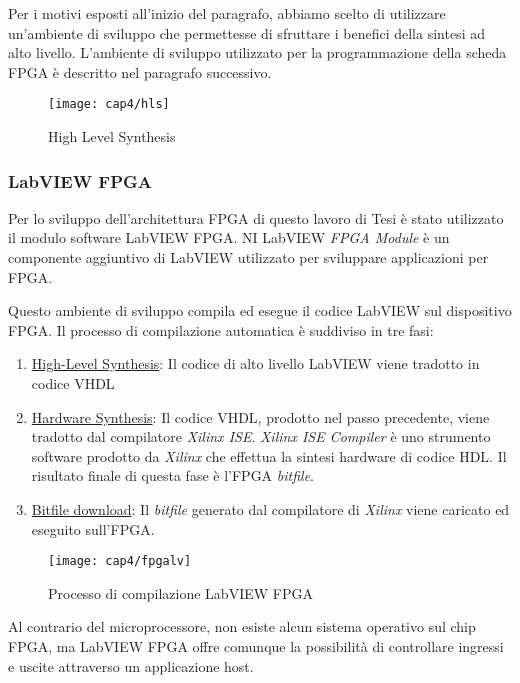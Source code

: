 Per i motivi esposti all'inizio del paragrafo, abbiamo scelto di utilizzare un'ambiente di sviluppo che permettesse di sfruttare i benefici della sintesi ad alto livello. L'ambiente di sviluppo utilizzato per la programmazione della scheda FPGA è descritto nel paragrafo successivo.

\begin{figure}  
  \begin{center}
    \texttt{[image: cap4/hls]}
    \caption{High Level Synthesis}
  \end{center}
\end{figure}
		
\subsubsection{LabVIEW FPGA}
Per lo sviluppo dell'architettura FPGA di questo lavoro di Tesi è stato utilizzato il modulo software LabVIEW FPGA. NI LabVIEW \textit{FPGA Module} è un componente aggiuntivo di LabVIEW utilizzato per sviluppare applicazioni per FPGA.

Questo ambiente di sviluppo compila ed esegue il codice LabVIEW sul dispositivo FPGA. Il processo di compilazione automatica è suddiviso in tre fasi:
\begin{enumerate}
	\item \underline{High-Level Synthesis}: Il codice di alto livello LabVIEW viene tradotto in codice VHDL
	\item \underline{Hardware Synthesis}: Il codice VHDL, prodotto nel passo precedente, viene tradotto dal compilatore \textit{Xilinx ISE}. \textit{Xilinx ISE Compiler} è uno strumento software prodotto da \textit{Xilinx} che effettua la sintesi hardware di codice HDL. Il risultato finale di questa fase è l'FPGA \textit{bitfile}.
	\item \underline{Bitfile download}: Il \textit{bitfile} generato dal compilatore di \textit{Xilinx} viene caricato ed eseguito sull'FPGA.
\end{enumerate}

\begin{figure}  
  \begin{center}
    \texttt{[image: cap4/fpgalv]}
    \caption{Processo di compilazione LabVIEW FPGA}
  \end{center}
\end{figure}

Al contrario del microprocessore, non esiste alcun sistema operativo sul chip FPGA, ma LabVIEW FPGA offre comunque la possibilità di controllare ingressi e uscite attraverso un applicazione host.

